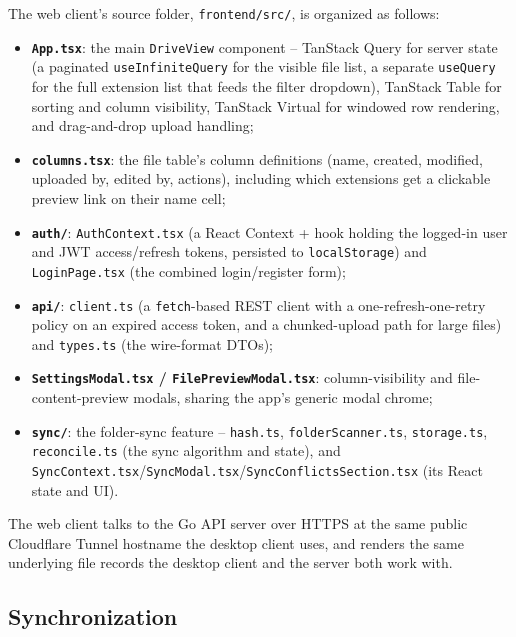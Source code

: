 \documentclass[12pt,a4paper]{article}
\begin{document}
The web client's source folder, \texttt{frontend/src/}, is organized as follows:

\begin{itemize}[nosep]
    \item \textbf{\texttt{App.tsx}}: the main \texttt{DriveView} component -- TanStack Query for server state (a paginated \texttt{useInfiniteQuery} for the visible file list, a separate \texttt{useQuery} for the full extension list that feeds the filter dropdown), TanStack Table for sorting and column visibility, TanStack Virtual for windowed row rendering, and drag-and-drop upload handling;
    \item \textbf{\texttt{columns.tsx}}: the file table's column definitions (name, created, modified, uploaded by, edited by, actions), including which extensions get a clickable preview link on their name cell;
    \item \textbf{\texttt{auth/}}: \texttt{AuthContext.tsx} (a React Context + hook holding the logged-in user and JWT access/refresh tokens, persisted to \texttt{localStorage}) and \texttt{LoginPage.tsx} (the combined login/register form);
    \item \textbf{\texttt{api/}}: \texttt{client.ts} (a \texttt{fetch}-based REST client with a one-refresh-one-retry policy on an expired access token, and a chunked-upload path for large files) and \texttt{types.ts} (the wire-format DTOs);
    \item \textbf{\texttt{SettingsModal.tsx} / \texttt{FilePreviewModal.tsx}}: column-visibility and file-content-preview modals, sharing the app's generic modal chrome;
    \item \textbf{\texttt{sync/}}: the folder-sync feature -- \texttt{hash.ts}, \texttt{folderScanner.ts}, \texttt{storage.ts}, \texttt{reconcile.ts} (the sync algorithm and state), and \texttt{SyncContext.tsx}/\texttt{SyncModal.tsx}/\texttt{SyncConflictsSection.tsx} (its React state and UI).
\end{itemize}

The web client talks to the Go API server over HTTPS at the same public Cloudflare Tunnel hostname the desktop client uses, and renders the same underlying file records the desktop client and the server both work with.

\subsection{Synchronization}
\end{document}
